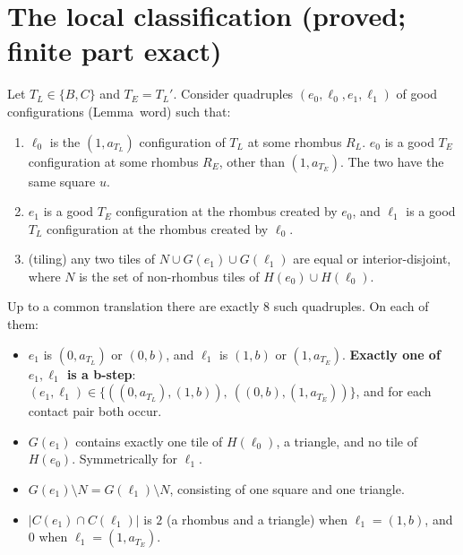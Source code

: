 \documentclass[11pt]{article}
\theoremstyle{definition}\newtheorem{definition}[theorem]{Definition}\newtheorem{remark}[theorem]{Remark}
\begin{document}
\section{The local classification (proved; finite part exact)}\label{sec:loc}
\begin{lemma}\label{lem:loc2}
Let $T_L\in\{B,C\}$ and $T_E=T_L'$. Consider quadruples $(e_0,\ell_0,e_1,\ell_1)$ of good configurations (Lemma~word) such that:
\begin{enumerate}
\item $\ell_0$ is the $(1,a_{T_L})$ configuration of $T_L$ at some rhombus $R_L$. $e_0$ is a good $T_E$ configuration at some rhombus $R_E$, other than $(1,a_{T_E})$. The two have the same square $u$.
\item $e_1$ is a good $T_E$ configuration at the rhombus created by $e_0$, and $\ell_1$ is a good $T_L$ configuration at the rhombus created by $\ell_0$.
\item (tiling) any two tiles of $N\cup G(e_1)\cup G(\ell_1)$ are equal or interior-disjoint, where $N$ is the set of non-rhombus tiles of $H(e_0)\cup H(\ell_0)$.
\end{enumerate}
Up to a common translation there are exactly 8 such quadruples. On each of them:
\begin{itemize}
\item[(a)] $e_1$ is $(0,a_{T_L})$ or $(0,b)$, and $\ell_1$ is $(1,b)$ or $(1,a_{T_E})$. \textbf{Exactly one of $e_1,\ell_1$ is a b-step}: $(e_1,\ell_1)\in\{((0,a_{T_L}),(1,b)),\ ((0,b),(1,a_{T_E}))\}$, and for each contact pair both occur.
\item[(b)] $G(e_1)$ contains exactly one tile of $H(\ell_0)$, a triangle, and no tile of $H(e_0)$. Symmetrically for $\ell_1$.
\item[(c)] $G(e_1)\setminus N=G(\ell_1)\setminus N$, consisting of one square and one triangle.
\item[(d)] $|C(e_1)\cap C(\ell_1)|$ is $2$ (a rhombus and a triangle) when $\ell_1=(1,b)$, and $0$ when $\ell_1=(1,a_{T_E})$.
\end{itemize}
\end{lemma}
\end{document}
